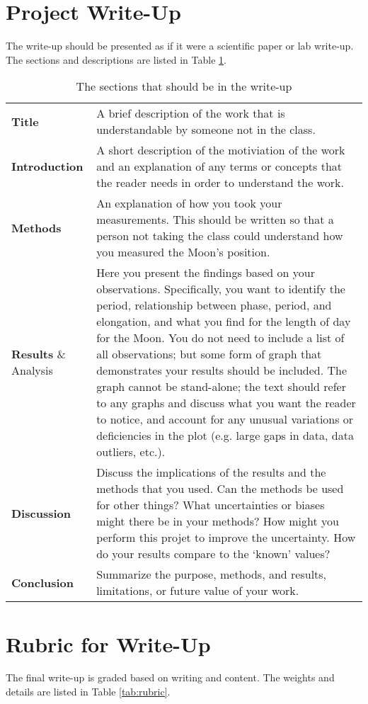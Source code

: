 \documentclass{exam}
\begin{document}
\section{Project Write-Up}
The write-up should be presented as if it were a scientific paper or lab write-up. The sections and descriptions are listed in Table \ref{tab:writeup}.
\begin{table}[!h]
\centering
\begin{tabular}{|lp{11cm}|}
\hline
\textbf{Title} & A brief description of the work that is understandable by someone not in the class.\\
\textbf{Introduction} & A short description of the motiviation of the work and an explanation of any terms or concepts that the reader needs in order to understand the work.\\
\textbf{Methods} & An explanation of how you took your measurements. This should be written so that a person not taking the class could understand how you measured the Moon's position.\\
\textbf{Results} \& Analysis & Here you present the findings based on your observations. Specifically, you want to identify the period, relationship between phase, period, and elongation, and what you find for the length of day for the Moon. You do not need to include a list of all observations; but some form of graph that demonstrates your results should be included. The graph cannot be stand-alone; the text should refer to any graphs and discuss what you want the reader to notice, and account for any unusual variations or deficiencies in the plot (e.g. large gaps in data, data outliers, etc.).\\
\textbf{Discussion} & Discuss the implications of the results and the methods that you used. Can the methods be used for other things? What uncertainties or biases might there be in your methods? How might you perform this projet to improve the uncertainty. How do your results compare to the `known' values?\\
\textbf{Conclusion} & Summarize the purpose, methods, and results, limitations, or future value of your work. \\
\hline
\end{tabular}
\caption{\label{tab:writeup}The sections that should be in the write-up}
\end{table}
\section{Rubric for Write-Up}
The final write-up is graded based on writing and content. The weights and details are listed in Table \ref{tab:rubric}.
\end{document}
